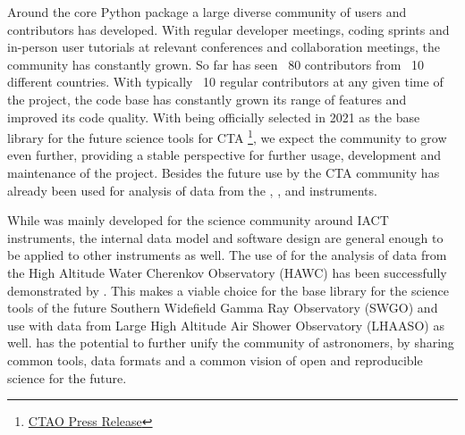 \documentclass[longauth]{aa}
\begin{document}
Around the core Python package a large diverse community of
users and contributors has developed. With regular developer meetings,
coding sprints and in-person user tutorials at relevant conferences
and collaboration meetings, the community has constantly grown.
So far \gammapy has seen ~80 contributors from ~10 different countries.
With typically ~10 regular contributors at any given time of the
project, the code base has constantly grown its range of features
and improved its code quality. With \gammapy being officially selected
in 2021 as the base library for the future science tools for CTA
\footnote{\href{https://www.cta-observatory.org/ctao-adopts-the-gammapy-software-package-for-science-analysis/}{CTAO Press Release}},
we expect the community to grow
even further, providing a stable perspective for further usage,
development and maintenance of the project. Besides the future use
by the CTA community \gammapy has already
been used for analysis of data from the \hess, \magic, \astri \citep[e.g.][]{Vercellone2022} and \veritas instruments.

While \gammapy was mainly developed for the science community around
IACT instruments, the internal data model and software design are general
enough to be applied to other \gammaray instruments as well.
The use of \gammapy for the analysis of data from the High Altitude
Water Cherenkov Observatory (HAWC) has been successfully
demonstrated by \cite{Olivera2022}. This makes \gammapy
a viable choice for the base library for the science tools
of the future Southern Widefield Gamma Ray Observatory
(SWGO) and use with data from Large High Altitude Air Shower Observatory (LHAASO) as well. \gammapy
has the potential to further unify the community
of \gammaray astronomers, by sharing common tools, data formats and
a common vision of open and reproducible science for the future.
\end{document}
